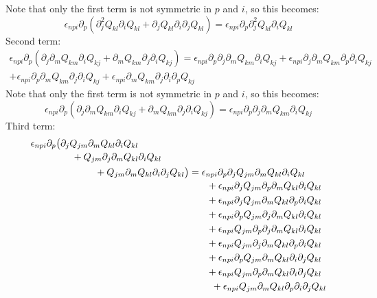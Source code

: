 \documentclass[reqno]{article}
\begin{document}
	Note that only the first term is not symmetric in $p$ and $i$, so this becomes:
	\begin{equation}
		\epsilon_{npi} \partial_p \left(
		\partial_j^2 Q_{kl} \partial_i Q_{kl} 
		+ \partial_j Q_{kl} \partial_i \partial_j Q_{kl}
		\right)
		= \epsilon_{npi} \partial_p \partial_j^2 Q_{kl} \partial_i Q_{kl}
	\end{equation}
	Second term:
	\begin{multline}
		\epsilon_{npi} \partial_p \left(
		\partial_j \partial_m Q_{km} \partial_i Q_{kj}
		+ \partial_m Q_{km} \partial_j \partial_i Q_{kj}
		\right)
		= \epsilon_{npi} \partial_p \partial_j \partial_m Q_{km} \partial_i Q_{kj}
		+ \epsilon_{npi}\partial_j \partial_m Q_{km} \partial_p \partial_i Q_{kj} \\
		+ \epsilon_{npi}\partial_p \partial_m Q_{km} \partial_j \partial_i Q_{kj}
		+ \epsilon_{npi}\partial_m Q_{km} \partial_j \partial_i \partial_p Q_{kj}
	\end{multline}
	Note that only the first term is not symmetric in $p$ and $i$, so this becomes:
	\begin{equation}
		\epsilon_{npi} \partial_p \left(
		\partial_j \partial_m Q_{km} \partial_i Q_{kj}
		+ \partial_m Q_{km} \partial_j \partial_i Q_{kj}
		\right)
		= \epsilon_{npi} \partial_p \partial_j \partial_m Q_{km} \partial_i Q_{kj}
	\end{equation}
	Third term:
	\begin{equation}
	\begin{multlined}[b]
		\epsilon_{npi} \partial_p \bigl(
		\partial_j Q_{jm} \partial_m Q_{kl} \partial_i Q_{kl} \\
		\hspace{0.5cm}+ Q_{jm} \partial_j \partial_m Q_{kl} \partial_i Q_{kl} \\
		\hspace{2cm}+ Q_{jm} \partial_m Q_{kl} \partial_i \partial_j Q_{kl}
		\bigr)
	\end{multlined}
		=
	\begin{multlined}[t]
		\epsilon_{npi} \partial_p \partial_j Q_{jm} \partial_m Q_{kl} \partial_i Q_{kl} \\
		+ \epsilon_{npi} \partial_j Q_{jm} \partial_p \partial_m Q_{kl} \partial_i Q_{kl} \\
		+ \epsilon_{npi} \partial_j Q_{jm} \partial_m Q_{kl} \partial_p \partial_i Q_{kl} \\
		+ \epsilon_{npi} \partial_p Q_{jm} \partial_j \partial_m Q_{kl} \partial_i Q_{kl} \\
		+ \epsilon_{npi} Q_{jm} \partial_p \partial_j \partial_m Q_{kl} \partial_i Q_{kl} \\
		+ \epsilon_{npi} Q_{jm} \partial_j \partial_m Q_{kl} \partial_p \partial_i Q_{kl} \\
		+ \epsilon_{npi} \partial_p Q_{jm} \partial_m Q_{kl} \partial_i \partial_j Q_{kl} \\
		+ \epsilon_{npi} Q_{jm} \partial_p \partial_m Q_{kl} \partial_i \partial_j Q_{kl} \\
		+ \epsilon_{npi} Q_{jm} \partial_m Q_{kl} \partial_p \partial_i \partial_j Q_{kl}
	\end{multlined}
	\end{equation}
\end{document}
